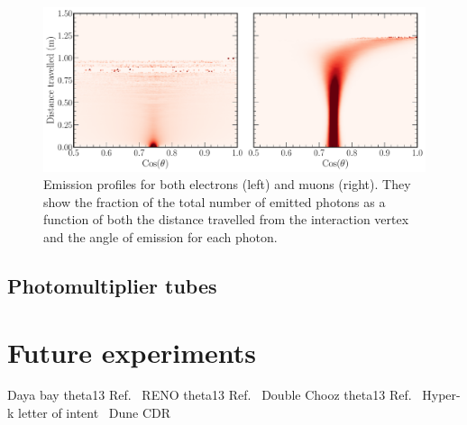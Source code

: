 \begin{figure} %
    \includegraphics[width=\textwidth]{diagrams/4-exp/emission_profile.pdf}
    \caption[Emission profiles for both electrons and muons]
    {Emission profiles for both electrons (left) and muons (right). They show the fraction of the
        total number of emitted photons as a function of both the distance travelled from the
        interaction vertex and the angle of emission for each photon.}
    \label{fig:emission_profile}
\end{figure}

\subsection{Photomultiplier tubes} %
\label{sec:exp_long_pmts} %

\section{Future experiments} %
\label{sec:exp_future} %

Daya bay theta13 Ref.~\cite{an2012}
RENO theta13 Ref.~\cite{ahn2012}
Double Chooz theta13 Ref.~\cite{abe2012}
Hyper-k letter of intent~\cite{abe2011}
Dune CDR~\cite{acciarri2016}

